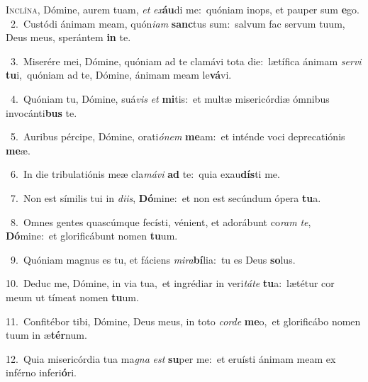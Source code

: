 \lettrine{\initial\textcolor{\initialcolor}{I}}{nclína,} Dómine, aurem tuam, \textit{et} \textit{ex}\-\textbf{áu}di me:~\star quóniam inops, et pauper sum \textbf{e}\-go.\\
{\numbfont\textcolor{\numbcolor}{~2.}}~Custódi ánimam meam, quón\-\textit{i}\-\textit{am} \textbf{sanc}\-tus sum:~\star salvum fac servum tuum, Deus meus, sperántem \textbf{in} te.\par
{\numbfont\textcolor{\numbcolor}{~3.}}~Miserére mei, Dómine, quóniam ad te clamávi tota die:~\dagger lætífica ánimam \textit{ser}\-\textit{vi} \textbf{tu}\-i,~\star quóniam ad te, Dómine, ánimam meam le\-\textbf{vá}\-vi.\par
{\numbfont\textcolor{\numbcolor}{~4.}}~Quóniam tu, Dómine, suá\textit{vis} \textit{et} \textbf{mi}\-tis:~\star et multæ misericórdiæ ómnibus invocánti\textbf{bus} te.\par
{\numbfont\textcolor{\numbcolor}{~5.}}~Auribus pércipe, Dómine, orati\-\textit{ó}\-\textit{nem} \textbf{me}\-am:~\star et inténde voci deprecatiónis \textbf{me}\-æ.\par
{\numbfont\textcolor{\numbcolor}{~6.}}~In die tribulatiónis meæ cla\-\textit{má}\-\textit{vi} \textbf{ad} te:~\star quia exau\-\textbf{dís}\-ti me.\par
{\numbfont\textcolor{\numbcolor}{~7.}}~Non est símilis tui in \textit{di}\-\textit{is}, \textbf{Dó}\-mine:~\star et non est secúndum ópera \textbf{tu}\-a.\par
{\numbfont\textcolor{\numbcolor}{~8.}}~Omnes gentes quascúmque fecísti, vénient, et adorábunt co\textit{ram} \textit{te}\-, \textbf{Dó}\-mine:~\star et glorificábunt nomen \textbf{tu}\-um.\par
{\numbfont\textcolor{\numbcolor}{~9.}}~Quóniam magnus es tu, et fáciens \textit{mi}\-\textit{ra}\textbf{bí}lia:~\star tu es Deus \textbf{so}\-lus.\par
{\numbfont\textcolor{\numbcolor}{10.}}~Deduc me, Dómine, in via tua,~\dagger et ingrédiar in veri\-\textit{tá}\-\textit{te} \textbf{tu}\-a:~\star lætétur cor meum ut tímeat nomen \textbf{tu}\-um.\par
{\numbfont\textcolor{\numbcolor}{11.}}~Confitébor tibi, Dómine, Deus meus, in toto \textit{cor}\-\textit{de} \textbf{me}\-o,~\star et glorificábo nomen tuum in æ\-\textbf{tér}\-num.\par
{\numbfont\textcolor{\numbcolor}{12.}}~Quia misericórdia tua ma\textit{gna} \textit{est} \textbf{su}\-per me:~\star et eruísti ánimam meam ex inférno inferi\-\textbf{ó}\-ri.\par
